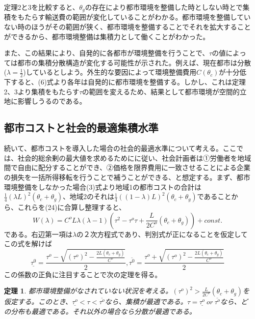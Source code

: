 \documentclass[a4paper]{jarticle}
\newtheorem{teiri}{定理}
\begin{document}
定理2と3を比較すると、$\theta_g$の存在により都市環境を整備した時としない時とで集積をもたらす輸送費の範囲が変化していることがわかる。都市環境を整備していない時のほうがその範囲が狭く、都市環境を整備することでそれを拡大することができるから、都市環境整備は集積力として働くことがわかった。

また、この結果により、自発的に各都市が環境整備を行うことで、$\tau$の値によっては都市の集積分散構造が変化する可能性が示された。例えば、現在都市は分散($\lambda = \frac{1}{2}$)しているとしよう。外生的な要因によって環境整備費用$C(\theta_c)$が十分低下すると、(6)式より各年は自発的に都市環境を整備する。しかし、これは定理2、3より集積をもたらす$\tau$の範囲を変えるため、結果として都市環境が空間的立地に影響しうるのである。

\subsection{都市コストと社会的最適集積水準}
続いて、都市コストを導入した場合の社会的最適水準について考える。ここでは、社会的総余剰の最大値を求めるために\citet{ottaviano02:aggl}に従い、社会計画者は①労働者を地域間で自由に配分することができ、②価格を限界費用に一致させることによる企業の損失を一括所得移転を行うことで補うことができる、と想定する。まず、都市環境整備をしなかった場合(3)式より地域1の都市コストの合計は$\frac{1}{4}(\lambda L)^2 (\theta_c + \theta_g)$、地域2のそれは$\frac{1}{4}((1 - \lambda) L)^2 (\theta_c + \theta_g)$であることから、これらを(24)に合算し整理すると、
\begin{equation}
W(\lambda) = C^o L \lambda (\lambda - 1) (\tau^2 - \tau^o \tau + \frac{L}{2C^o}(\theta_c + \theta_g)) + const.
\end{equation}
である。右辺第一項は$\lambda$の２次方程式であり、判別式が正になることを仮定してこの式を解けば
\begin{equation}
\underline{\tau^0} = \frac{\tau^o - \sqrt{(\tau^o)^2 - \frac{2L(\theta_c + \theta_g)}{C^o}}}{2} , \overline{\tau^0} = \frac{\tau^o + \sqrt{(\tau^o)^2 - \frac{2L(\theta_c + \theta_g)}{C^o}}}{2}
\end{equation}
この係数の正負に注目することで次の定理を得る。

\begin{teiri}
都市環境整備がなされていない状況を考える。$(\tau^o)^2 > \frac{L}{2C^o}(\theta_c + \theta_g)$を仮定する。このとき、$\underline{\tau^o} < \tau < \overline{\tau^o}$なら、集積が最適である。$\tau = \underline{\tau^o}\ or \ \overline{\tau^o}$なら、どの分布も最適である。それ以外の場合なら分散が最適である。
\end{teiri}
\end{document}
